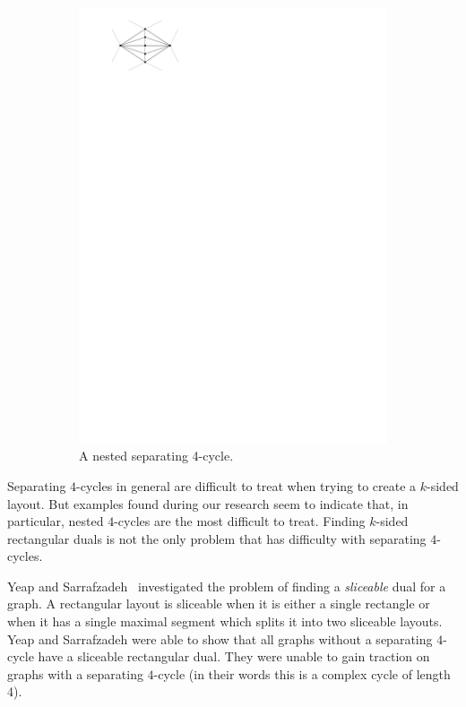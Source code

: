 \begin{figure}
\begin{subfigure}[t]{2cm}
          \includegraphics[width =\textwidth]{introduction/img/nest4cycle.pdf}
          \caption{A nested separating 4-cycle.}
      \end{subfigure}
    \caption{}
    \label{fig:intro:4cycle}
  \end{figure}


  Separating $4$-cycles in general are difficult to treat when trying to create a $k$-sided layout.
  But examples found during our research seem to indicate that, in particular, nested $4$-cycles are the most difficult to treat.
  Finding $k$-sided rectangular duals is not the only problem that has difficulty with separating $4$-cycles.

  Yeap and Sarrafzadeh~\cite{Yeap1995} investigated the problem of finding a \emph{sliceable} dual for a graph. A rectangular layout is sliceable when it is either a single rectangle or when it has a single maximal segment which splits it into two sliceable layouts.
  Yeap and Sarrafzadeh were able to show that all graphs without a separating $4$-cycle have a sliceable rectangular dual.
  They were unable to gain traction on graphs with a separating $4$-cycle (in their words this is a complex cycle of length 4).

